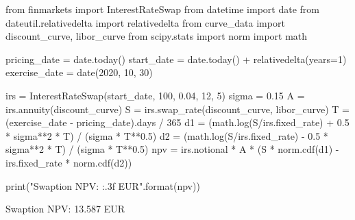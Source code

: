 \cprotEnv\begin{solution}
\begin{ipython}
from finmarkets import InterestRateSwap
from datetime import date
from dateutil.relativedelta import relativedelta
from curve_data import discount_curve, libor_curve
from scipy.stats import norm
import math

pricing_date = date.today()
start_date = date.today() + relativedelta(years=1)
exercise_date = date(2020, 10, 30)

irs = InterestRateSwap(start_date, 100, 0.04, 12, 5)
sigma = 0.15
A = irs.annuity(discount_curve)
S = irs.swap_rate(discount_curve, libor_curve)
T = (exercise_date - pricing_date).days / 365
d1 = (math.log(S/irs.fixed_rate) + 0.5 * sigma**2 * T) / (sigma * T**0.5)
d2 = (math.log(S/irs.fixed_rate) - 0.5 * sigma**2 * T) / (sigma * T**0.5)
npv = irs.notional * A * (S * norm.cdf(d1) - irs.fixed_rate * norm.cdf(d2))

print("Swaption NPV: {:.3f} EUR".format(npv))
\end{ipython}
\begin{ioutput}
Swaption NPV: 13.587 EUR
\end{ioutput}
\end{solution}
